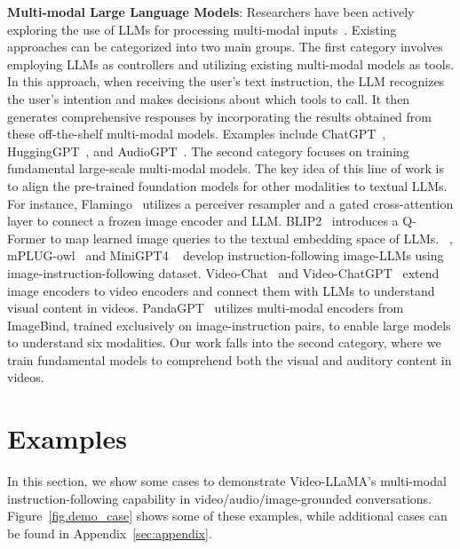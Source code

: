 \textbf{Multi-modal Large Language Models}: 
Researchers have been actively exploring the use of LLMs for processing multi-modal inputs~\citep{gao2023llamaadaptervp,li2023videochatcv}. Existing approaches can be categorized into two main groups. The first category involves employing LLMs as controllers and utilizing existing multi-modal models as tools. In this approach, when receiving the user's text instruction, the LLM recognizes the user's intention and makes decisions about which tools to call. It then generates comprehensive responses by incorporating the results obtained from these off-the-shelf multi-modal models. Examples include ChatGPT~\citep{wu2023visual}, HuggingGPT~\citep{shen2023hugginggpt}, and AudioGPT~\citep{huang2023audiogpt}. 
The second category focuses on training fundamental large-scale multi-modal models. The key idea of this line of work is to align the pre-trained foundation models for other modalities to textual LLMs. For instance, Flamingo~\citep{alayrac2022flamingo} utilizes a perceiver resampler and a gated cross-attention layer to connect a frozen image encoder and LLM.
BLIP2~\citep{li2023blip2bl} introduces a Q-Former to map learned image queries to the textual embedding space of LLMs. ~\citep{liu2023visualit}, mPLUG-owl~\citep{ye2023mplugowl} and MiniGPT4 ~\citep{zhu2023minigpt} develop instruction-following image-LLMs using image-instruction-following dataset. Video-Chat~\citep{li2023videochatcv} and Video-ChatGPT~\citep{maaz2023videochatgpt} extend image encoders to video encoders and connect them with LLMs to understand visual content in videos. PandaGPT~\citep{pandagpt} utilizes multi-modal encoders from ImageBind, trained exclusively on image-instruction pairs, to enable large models to understand six modalities. Our work falls into the second category, where we train fundamental models to comprehend both the visual and auditory content in videos. 

\section{Examples}
In this section, we show some cases to demonstrate Video-LLaMA's  multi-modal instruction-following capability in video/audio/image-grounded conversations. Figure~\ref{fig.demo_case} shows some of these examples, while additional cases can be found in  Appendix~\ref{sec:appendix}.

